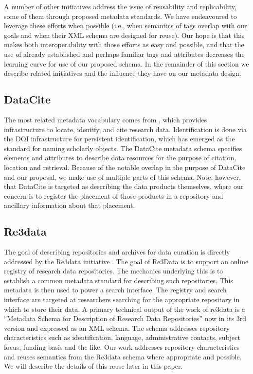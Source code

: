 A number of other initiatives address the issue of reusability and replicability, some of them through proposed metadata standards.  We have endeavoured to leverage these efforts when possible (i.e., when semantics of tags overlap with our goals and when their XML schema are designed for reuse).  Our hope is that this makes both interoperability with those efforts as easy and possible, and that the use of already established and perhaps familiar tags and attributes decreases the learning curve for use of our proposed schema.  In the remainder of this section we describe related initiatives and the influence they have on our metadata design.

\subsection{DataCite}
The most related metadata vocabulary comes from , which provides infrastructure to locate, identify, and cite research data. Identification is done via the DOI infrastructure for persistent identification, which has emerged as the standard for naming scholarly objects.  The DataCite metadata schema \parencite{DataCiteMetadataWorkingGroupDataCiteMetadataSchema2017a,DataCiteMetadataWorkingGroupDataCiteMetadataSchema2017} specifies elements and attributes to describe data resources for the purpose of citation, location and retrieval.  Because of the notable overlap in the purpose of DataCite  and our proposal, we make use of multiple parts of this schema. Note, however, that DataCite is targeted as describing the data products themselves, where our concern is to register the placement of those products in a repository and ancillary information about that placement.

\subsection{Re3data}
The goal of describing repositories and archives for data curation is directly addressed by the Re3data initiative \parencite{RucknagelMetadataSchemaDescription2015,Re3data.Orgre3dataorgMetadata2015}.  The goal of Re3Data is to support an online registry of research data repositories.   The mechanics underlying this is to establish a common metadata standard for describing such repositories, This metadata is then used to power a search interface.  The registry and search interface are targeted at researchers searching for the appropriate repository in which to store their data.
A primary technical output of the work of re3data is a ``Metadata Schema for Description of Research Data Repositories'' now in its 3rd version and expressed as an XML schema.  The schema addresses repository characteristics such as identification,   language, administrative contacts, subject focus, funding basis and the like.  Our work addresses repository characteristics and reuses semantics from the Re3data schema where appropriate and possible.  We will describe the details of this reuse later in this paper.


